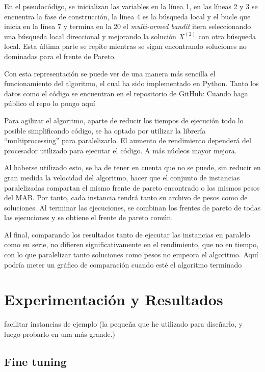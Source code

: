 \documentclass[12pt,a4paper]{book}
\begin{document}
En el pseudocódigo, se inicializan las variables en la línea 1, en las líneas 2 y 3 se encuentra la fase de construcción, la línea 4
es la búsqueda local y el bucle que inicia en la línea 7 y termina en la 20 el \textit{multi-armed bandit} itera seleccionando una búsqueda local direccional
y mejorando la solución $X^{(2)}$ con otra búsqueda local. Esta última parte se repite mientras se sigan encontrando soluciones no dominadas para el frente de Pareto.


Con esta representación se puede ver de una manera más sencilla el funcionamiento del algoritmo, el cual ha sido implementado en Python. Tanto los datos como el código se encuentran en el repositorio de GitHub: \color{red}Cuando haga público el repo lo pongo aquí \color{black}

Para agilizar el algoritmo, aparte de reducir los tiempos de ejecución todo lo posible simplificando código, se ha optado por utilizar la librería ``multiprocessing'' para paralelizarlo.
El aumento de rendimiento dependerá del procesador utilizado para ejecutar el código. A más núcleos mayor mejora.

Al haberse utilizado esto, se ha de tener en cuenta que no se puede, sin reducir en gran medida la velocidad del algoritmo, hacer que el conjunto de instancias paralelizadas compartan
el mismo frente de pareto encontrado o los mismos pesos del MAB. Por tanto, cada instancia tendrá tanto su archivo de pesos como de soluciones. Al terminar las ejecuciones, se combinan los frentes de pareto de 
todas las ejecuciones y se obtiene el frente de pareto común.

Al final, comparando los resultados tanto de ejecutar las instancias en paralelo como en serie, no difieren significativamente en el rendimiento, que no en tiempo, con lo que paralelizar tanto soluciones como pesos no empeora 
el algoritmo. \color{red} Aquí podría meter un gráfico de comparación cuando esté el algoritmo terminado \color{black}

\chapter{Experimentación y Resultados}

facilitar instancias de ejemplo (la pequeña que he utilizado para diseñarlo, y luego probarlo en una más grande.)

\section{Fine tuning}
\end{document}
